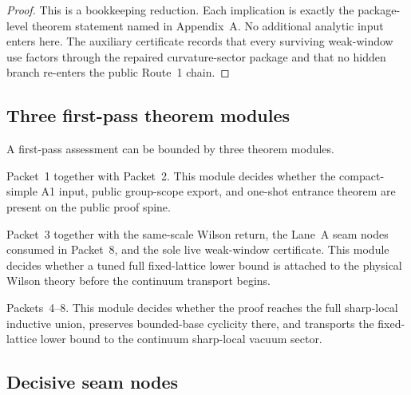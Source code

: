\begin{proof}
This is a bookkeeping reduction. Each implication is exactly the package-level theorem statement named in Appendix~A. No additional analytic input enters here. The auxiliary certificate records that every surviving weak-window use factors through the repaired curvature-sector package and that no hidden branch re-enters the public Route~1 chain.
\end{proof}

\subsection{Three first-pass theorem modules}

A first-pass assessment can be bounded by three theorem modules.
\begin{description}[leftmargin=2.2em,style=nextline]
\item[Ultraviolet/public-scope gate.] Packet~1 together with Packet~2. This module decides whether the compact-simple A1 input, public group-scope export, and one-shot entrance theorem are present on the public proof spine.
\item[Route~1 lattice-side burden.] Packet~3 together with the same-scale Wilson return, the Lane~A seam nodes consumed in Packet~8, and the sole live weak-window certificate. This module decides whether a tuned full fixed-lattice lower bound is attached to the physical Wilson theory before the continuum transport begins.
\item[Lane~A and QE3 closure chain.] Packets~4--8. This module decides whether the proof reaches the full sharp-local inductive union, preserves bounded-base cyclicity there, and transports the fixed-lattice lower bound to the continuum sharp-local vacuum sector.
\end{description}

\subsection{Decisive seam nodes}

